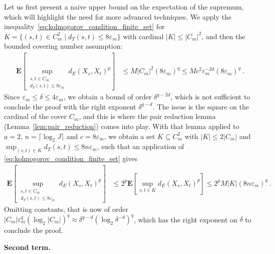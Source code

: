 \documentclass[lean]{Draft}
\begin{document}
Let us first present a naive upper bound on the expectation of the supremum, which will highlight the need for more advanced techniques.
We apply the inequality~\eqref{eq:kolmogorov_condition_finite_set} for $K = \{(s,t) \in C_m^2 \mid d_T(s, t) \le 8 \varepsilon_m\}$ with cardinal $\lvert K \rvert \le \lvert C_m \rvert^2$, and then the bounded covering number assumption:
\begin{align*}
  \mathbf{E}\left[ \sup_{\substack{s, t \in C_m \\ d_T(s, t) \le 8 \varepsilon_m}} d_E(X_s, X_t)^p \right]
  &\le M \lvert C_m \rvert^2 (8 \varepsilon_m)^q
  \le M c^2 \varepsilon_m^{-2d} (8 \varepsilon_m)^q
  \: .
\end{align*}
Since $\varepsilon_m \le \delta \le 4 \varepsilon_m$, we obtain a bound of order $\delta^{q - 2d}$, which is not sufficient to conclude the proof with the right exponent $\delta^{q - d}$.
The issue is the square on the cardinal of the cover $C_m$, and this is where the pair reduction lemma (Lemma~\ref{lem:pair_reduction}) comes into play.
With that lemma applied to $a = 2$, $n = \lceil \log_2 J \rceil$ and $c = 8 \varepsilon_m$, we obtain a set $K \subseteq C_m^2$ with $\lvert K \rvert \le 2 \lvert C_m \rvert$ and $\sup_{(s, t) \in K} d_T(s, t) \le 8 n \varepsilon_m$, such that an application of \eqref{eq:kolmogorov_condition_finite_set} gives
\begin{align*}
  \mathbf{E}\left[ \sup_{\substack{s, t \in C_m \\ d_T(s, t) \le 8 \varepsilon_m}} d_E(X_s, X_t)^p \right]
  &\le 2^p \mathbf{E}\left[ \sup_{s, t \in K} d_E(X_s, X_t)^p \right]
  \le 2^p M \lvert K \rvert (8 n \varepsilon_m)^q
  \: .
\end{align*}
Omitting constants, that is now of order
$\lvert C_m \rvert \varepsilon_m^q (\log_2 \lvert C_m\rvert)^q \approx \delta^{q - d} \left(\log_2 \delta^{-d} \right)^q
$, which has the right exponent on $\delta$ to conclude the proof.

\textbf{Second term.}
\end{document}
